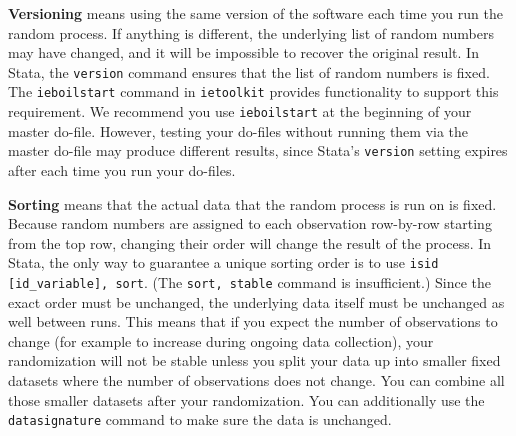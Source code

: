 \textbf{Versioning} means using the same version of the software each time you run the random process.
If anything is different, the underlying list of random numbers may have changed,
and it will be impossible to recover the original result.
In Stata, the \texttt{version} command ensures that the list of random numbers is fixed.
The \texttt{ieboilstart} command in \texttt{ietoolkit} provides functionality to support this requirement.
We recommend you use \texttt{ieboilstart} at the beginning of your master do-file.
However, testing your do-files without running them
via the master do-file may produce different results,
since Stata's \texttt{version} setting expires after each time you run your do-files.

\textbf{Sorting} means that the actual data that the random process is run on is fixed.
Because random numbers are assigned to each observation row-by-row starting from
the top row,
changing their order will change the result of the process.
In Stata, the only way to guarantee a unique sorting order is to use
\texttt{isid [id\_variable], sort}.
(The \texttt{sort, stable} command is insufficient.)
Since the exact order must be unchanged,
the underlying data itself must be unchanged as well between runs.
This means that if you expect the number of observations to change
(for example to increase during ongoing data collection),
your randomization will not be stable unless you split your data up into
smaller fixed datasets where the number of observations does not change.
You can combine all
those smaller datasets after your randomization.
You can additionally use the \texttt{datasignature} command to make sure the
data is unchanged.

